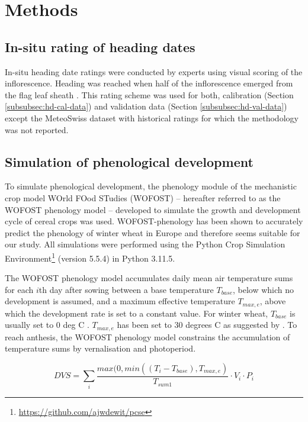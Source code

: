 \section{Methods}
\label{sec:hd-methods}
\subsection{In-situ rating of heading dates}
\label{subsec:rating-method}
In-situ heading date ratings were conducted by experts using visual scoring of the inflorescence. Heading was reached when half of the inflorescence emerged from the flag leaf sheath \citep{meier_growth_2018}. This rating scheme was used for both, calibration (Section \ref{subsubsec:hd-cal-data}) and validation data (Section \ref{subsubsec:hd-val-data}) except the MeteoSwiss dataset with historical ratings for which the methodology was not reported.

\subsection{Simulation of phenological development}
To simulate phenological development, the phenology module of the mechanistic crop model WOrld FOod STudies (WOFOST) -- hereafter referred to as the \gls{WOFOST} phenology model -- developed to simulate the growth and development cycle of cereal crops \citep{diepen_wofost_1989} was used. WOFOST-phenology has been shown to accurately predict the phenology of winter wheat in Europe \citep{ceglar_improving_2019} and therefore seems suitable for our study.
All simulations were performed using the Python Crop Simulation Environment\footnote{\url{https://github.com/ajwdewit/pcse}} (version 5.5.4) in Python 3.11.5.

The \gls{WOFOST} phenology model accumulates daily mean air temperature sums for each $i$th day after sowing between a base temperature $T_{base}$, below which no development is assumed, and a maximum effective temperature $T_{max, e}$, above which the development rate is set to a constant value. For winter wheat, $T_{base}$ is usually set to 0 deg C \citep{porter_temperatures_1999}. $T_{max,e}$ has been set to 30 degrees C as suggested by \cite{ceglar_improving_2019}. To reach anthesis, the \gls{WOFOST} phenology model constrains the accumulation of temperature sums by vernalisation and photoperiod.

\begin{equation}
\label{eq:dvs}
    DVS = \sum_i \frac{max(0, min((T_i-T_{base}), T_{max, e})}{T_{sum1}} \cdot V_{i} \cdot P_{i}
\end{equation}

